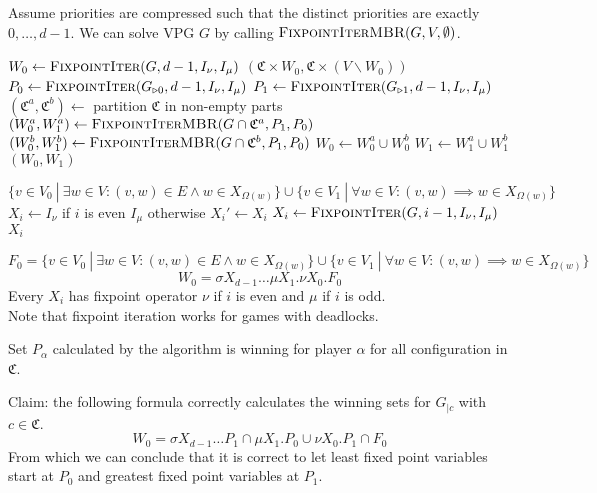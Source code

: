\documentclass[]{article}
\begin{document}
Assume priorities are compressed such that the distinct priorities are exactly $0,\dots,d-1$. We can solve VPG $G$ by calling $\textsc{FixpointIterMBR}(G, V,\emptyset)$.
\begin{algorithm}
	\caption{$\textsc{FixpointIterMBR}(\textit{VPG }G, I_\nu, I_\mu)$}
	\begin{algorithmic}[1]
			\State $W_0 \gets \textsc{FixpointIter}(G,d-1,I_\nu,I_\mu)$
			\State \Return $(\mathfrak{C} \times W_0, \mathfrak{C} \times (V \backslash W_0))$
		\EndIf
		\State $P_0 \gets \textsc{FixpointIter}(G_{\triangleright0},d-1,I_\nu,I_\mu)$
		\State $P_1 \gets \textsc{FixpointIter}(G_{\triangleright1},d-1,I_\nu,I_\mu)$
		\State $(\mathfrak{C}^a,\mathfrak{C}^b) \gets$ partition $\mathfrak{C}$ in non-empty parts
		\State $(W_0^a, W_1^a) \gets \textsc{FixpointIterMBR}(G \cap \mathfrak{C}^a,P_1,P_0)$
		\State $(W_0^b, W_1^b) \gets \textsc{FixpointIterMBR}(G \cap \mathfrak{C}^b,P_1,P_0)$
		\State $W_0 \gets W_0^a \cup W_0^b$
		\State $W_1 \gets W_1^a \cup W_1^b$
		\State \Return $(W_0,W_1)$
	\end{algorithmic}
\end{algorithm}
\begin{algorithm}
\caption{$\textsc{FixpointIter}(\textit{PG } G, i, I_\nu, I_\mu)$}
\begin{algorithmic}[1]
		\State \Return $\{ v \in V_0\ |\ \exists w \in V: (v,w) \in E \wedge w \in X_{\Omega(w)}\}\cup \{ v \in V_1\ |\ \forall w \in V : (v,w) \implies w \in X_{\Omega(w)} \}$
	\Else
		\State $X_i \gets I_\nu$ if $i$ is even $I_\mu$ otherwise
		\Repeat
			\State $X_i' \gets X_i$
			\State $X_i \gets\textsc{FixpointIter}(G, i-1,I_\nu, I_\mu)$
		\State \Return $X_i$
	\EndIf
\end{algorithmic}
\end{algorithm}
\[ F_0 = \{ v \in V_0\ |\ \exists w \in V: (v,w) \in E \wedge w \in X_{\Omega(w)}\}\cup \{ v \in V_1\ |\ \forall w \in V : (v,w) \implies w \in X_{\Omega(w)} \} \]
\[ W_0 = \sigma X_{d-1}\dots \mu X_1. \nu X_0.F_0 \]
Every $X_i$ has fixpoint operator $\nu$ if $i$ is even and $\mu$ if $i$ is odd.\\
Note that fixpoint iteration works for games with deadlocks.

Set $P_\alpha$ calculated by the algorithm is winning for player $\alpha$ for all configuration in $\mathfrak{C}$.

Claim: the following formula correctly calculates the winning sets for $G_{|c}$ with $c \in \mathfrak{C}$.
\[ W_0 = \sigma X_{d-1}\dots P_1 \cap \mu X_1. P_0 \cup \nu X_0.P_1 \cap F_0  \]
From which we can conclude that it is correct to let least fixed point variables start at $P_0$ and greatest fixed point variables at $P_1$.
\end{document}
